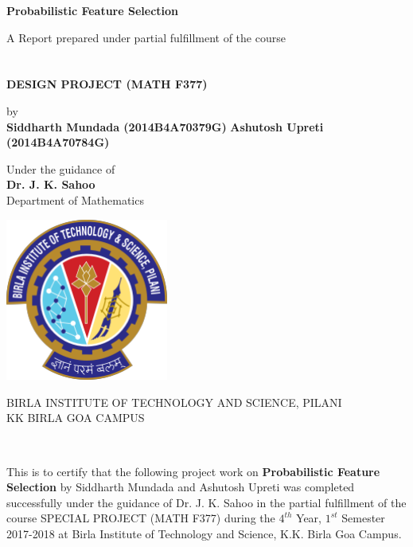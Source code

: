\documentclass[a4paper, 14pt]{article}
\begin{document}
\begin{titlepage}
    \begin{center}
        \vspace*{1cm}
        
        \Huge
        \textbf{Probabilistic Feature Selection }
        
        \vspace{1cm}
        \LARGE
        A Report prepared under partial fulfillment of the course \\ \\
        \textbf{\\ DESIGN PROJECT (MATH F377)}
        
        \vspace{0.1cm}
        by\\
        \textbf{Siddharth Mundada (2014B4A70379G)}
        \textbf{Ashutosh Upreti (2014B4A70784G)}

        \vfill
        
        Under the guidance of \\
        \vspace{0.4cm}
        \textbf{Dr. J. K. Sahoo}\\
        Department of Mathematics
        
        \vspace{0.8cm}
        
        \includegraphics[width=0.4\textwidth]{bitslogo}
        \vspace{0.6cm}
        \large
        
        BIRLA INSTITUTE OF TECHNOLOGY AND SCIENCE, PILANI\\
        KK BIRLA GOA CAMPUS
        
        
    \end{center}
\end{titlepage}


\\[0in]
\begin{flushleft}
\justify
This is to certify that the following project work on \textbf{Probabilistic Feature Selection} by Siddharth Mundada and Ashutosh Upreti was completed successfully under the guidance of Dr. J. K. Sahoo in the partial fulfillment of the course SPECIAL PROJECT (MATH F377) during the $4^{th}$ Year,
$1^{st}$ Semester 2017-2018 at Birla Institute of Technology and
Science, K.K. Birla Goa Campus.
\end{flushleft}
\end{document}
